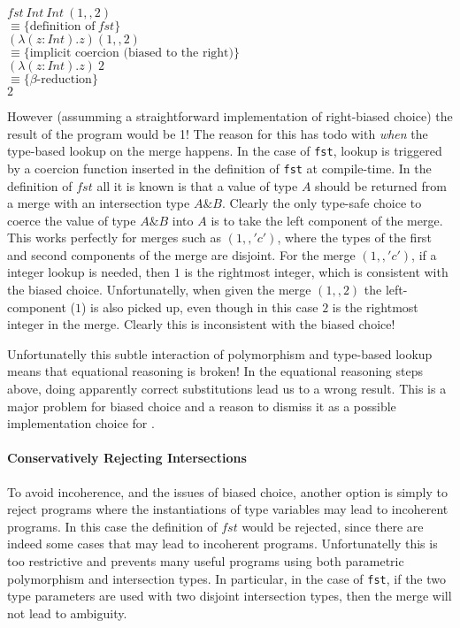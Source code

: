 \vspace{5pt}
\noindent$fst~Int~Int~(1,,2)$\\
$\equiv\{\text{definition of}~fst\}$\\
$(\lambda (z : Int). z) (1,,2)$\\
$\equiv\{\text{implicit coercion (biased to the right)}\}$\\
$(\lambda (z : Int). z)~2$\\
$\equiv\{\beta\text{-reduction}\}$\\
$2$
\vspace{5pt}

However (assumming a straightforward implementation of right-biased
choice) the result of the program would be 1! The reason for this has
todo with \emph{when} the type-based lookup on the merge happens. In
the case of \lstinline{fst}, lookup is triggered by a coercion
function inserted in the definition of \lstinline{fst} at
compile-time.
In the definition of $fst$ all it is known is that a
value of type $A$ should be returned from a merge with an intersection
type $A\&B$.  Clearly the only type-safe choice to coerce the value of
type $A\&B$ into $A$ is to
take the left component of the merge. This works perfectly for merges
such as $(1,,'c')$, where the types of the first and second components
of the merge are disjoint. For the merge $(1,,'c')$, if a integer lookup
is needed, then $1$ is the rightmost integer, which is consistent with the
biased choice. Unfortunatelly, when given the merge $(1,,2)$ the
left-component ($1$) is also picked up, even though in this case $2$
is the rightmost integer in the merge. Clearly this is inconsistent
with the biased choice!

Unfortunatelly this subtle interaction of polymorphism and type-based lookup
 means that equational reasoning is broken!
In the equational reasoning steps above, doing apparently correct
substitutions lead us to a wrong result. This is a major problem for
biased choice and a reason to dismiss it as a possible implementation
choice for \name.

\paragraph{Conservatively Rejecting Intersections}
To avoid incoherence, and the issues of biased choice, another option
is simply to reject programs where the
instantiations of type variables may lead to incoherent programs.
In this case the definition of $fst$ would be rejected, since there
are indeed some cases that may lead to incoherent programs.
Unfortunatelly this is too restrictive and prevents many useful
programs using both parametric polymorphism and intersection types.
In particular, in the case of \lstinline{fst}, if the two type
parameters are used with two disjoint intersection
types, then the merge will not lead to ambiguity.

